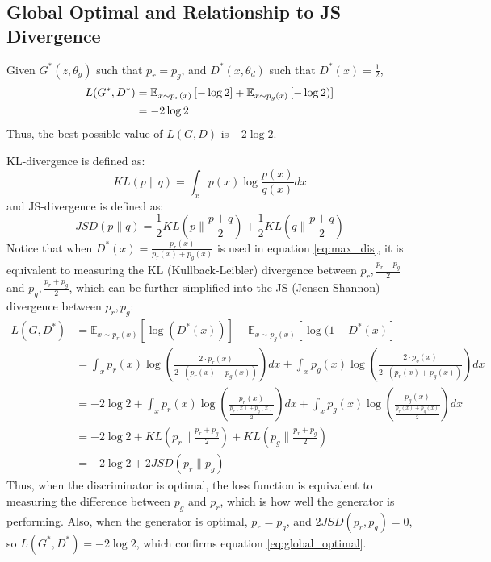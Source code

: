         \subsection{Global Optimal and Relationship to JS Divergence}\label{sec:global_opt}
        Given $G^*(z, \theta_g)$ such that $p_r = p_g$, and $D^*(x, \theta_d)$ such that $D^*(x) = \frac{1}{2}$,
        \begin{align}\label{eq:global_optimal}
            L(G^*, D^*) &= \mathbb{E}_{x\sim p_r(x)}\left[-\log2\right] +\mathbb{E}_{x\sim p_g(x)}\left[-\log2)\right]\notag\\
            &= -2\log2
        \end{align}
        Thus, the best possible value of $L(G, D)$ is $-2\log2$.\par
        KL-divergence is defined as:
        \begin{equation}\label{eq:KL}
            KL(p\|q) = \int_{x}p(x)\log\frac{p(x)}{q(x)}dx
        \end{equation}
        and JS-divergence is defined as:
        $$
        JSD(p\|q) = \frac{1}{2}KL(p\|\frac{p+q}{2}) + \frac{1}{2}KL(q\|\frac{p+q}{2})
        $$
        Notice that when $D^*(x) = \frac{p_r(x)}{p_r(x)+p_g(x)}$ is used in equation \eqref{eq:max_dis}, it is equivalent to measuring the KL (Kullback-Leibler) divergence between $p_r, \frac{p_r+p_g}{2}$ and $p_g, \frac{p_r+p_g}{2}$, which can be further simplified into the JS (Jensen-Shannon) divergence between $p_r, p_g$:
        \begin{align*}
            L(G, D^*) &= \mathbb{E}_{x\sim p_r(x)}\left[\log (D^*(x))\right] +\mathbb{E}_{x\sim p_g(x)}\left[\log(1- D^*(x)\right]\\
            &= \int_{x}p_r(x)\log\left(\frac{2\cdot p_r(x)}{2\cdot(p_r(x)+p_g(x))}\right)dx+ \int_{x}p_g(x)\log\left(\frac{2\cdot p_g(x)}{2\cdot(p_r(x)+p_g(x))}\right)dx\\
            &= -2\log2 + \int_{x}p_r(x)\log\left(\frac{p_r(x)}{\frac{p_r(x)+p_g(x)}{2}}\right)dx+ \int_{x}p_g(x)\log\left(\frac{p_g(x)}{\frac{p_r(x)+p_g(x)}{2}}\right)dx\\
            &= -2\log2 + KL(p_r\|\frac{p_r+p_g}{2}) + KL(p_g\|\frac{p_r+p_g}{2})\\
            &= -2\log2 + 2JSD(p_r\|p_g)
        \end{align*}
        Thus, when the discriminator is optimal, the loss function is equivalent to measuring the difference between $p_g$ and $p_r$, which is how well the generator is performing. Also, when the generator is optimal, $p_r = p_g$, and $2JSD(p_r, p_g)=0$, so $L(G^*, D^*) = -2\log2$, which confirms equation \eqref{eq:global_optimal}.\par
        
